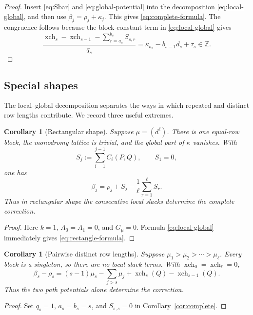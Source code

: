 \documentclass[11pt]{article}
\newtheorem{corollary}[theorem]{Corollary}
\theoremstyle{definition}
\theoremstyle{remark}
\newcommand{\Z}{\mathbb Z}
\newcommand{\xch}{\operatorname{xch}}
\begin{document}
\begin{proof}
Insert \eqref{eq:Sbar} and \eqref{eq:global-potential} into the decomposition
\eqref{eq:local-global}, and then use \(\beta_j=\rho_j+\kappa_j\).  This gives
\eqref{eq:complete-formula}.  The congruence follows because the block-constant term in
\eqref{eq:local-global} gives
\[
 \frac{\xch_s-\xch_{s-1}-\sum_{r=a_s}^{b_s}S_{s,r}}{q_s}
 =\kappa_{a_s}-b_{s-1}d_s+\tau_s\in\Z.
\]
\end{proof}

\subsection{Special shapes}

The local--global decomposition separates the ways in which repeated and distinct row
lengths contribute.  We record three useful extremes.

\begin{corollary}[Rectangular shape]\label{cor:rectangle}
Suppose \(\mu=(d^\ell)\).  There is one equal-row block, the monodromy lattice is
trivial, and the global part of \(\kappa\) vanishes.  With
\[
 S_j:=\sum_{i=1}^{j-1}C_i(P,Q),\qquad S_1=0,
\]
one has
\begin{equation}\label{eq:rectangle-formula}
 \beta_j=\rho_j+S_j-\frac1\ell\sum_{r=1}^{\ell}S_r.
\end{equation}
Thus in rectangular shape the consecutive local slacks determine the complete
correction.
\end{corollary}

\begin{proof}
Here \(k=1\), \(A_0=A_1=0\), and \(G_\mu=0\).  Formula
\eqref{eq:local-global} immediately gives \eqref{eq:rectangle-formula}.
\end{proof}

\begin{corollary}[Pairwise distinct row lengths]\label{cor:distinct-parts}
Suppose \(\mu_1>\mu_2>\cdots>\mu_\ell\).  Every block is a singleton, so there are no
local slack terms.  With \(\xch_0=\xch_\ell=0\),
\begin{equation}\label{eq:distinct-formula}
 \beta_s-\rho_s
 =(s-1)\mu_s-\sum_{j>s}\mu_j
  +\xch_s(Q)-\xch_{s-1}(Q).
\end{equation}
Thus the two path potentials alone determine the correction.
\end{corollary}

\begin{proof}
Set \(q_s=1\), \(a_s=b_s=s\), and \(S_{s,s}=0\) in
Corollary~\ref{cor:complete}.
\end{proof}
\end{document}
